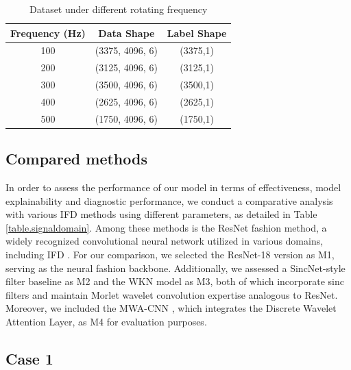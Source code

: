 \documentclass[lettersize,journal]{IEEEtran}
\begin{document}
\begin{table}[h]
    \centering
    \caption{Dataset under different rotating frequency}
    \begin{tabular*}{\linewidth}{@{\extracolsep{\fill}}ccc@{}} \hline
        
        \textbf{Frequency (Hz)} & \textbf{Data Shape} & \textbf{Label Shape} \\ \hline
        
        100 & (3375, 4096, 6) & (3375,1) \\
        
        200 & (3125, 4096, 6) & (3125,1) \\
        
        300 & (3500, 4096, 6) & (3500,1) \\
        
        400 & (2625, 4096, 6) & (2625,1) \\
        
        500 & (1750, 4096, 6) & (1750,1) \\ \hline
        
    \end{tabular*}
\label{WC}
\end{table}


\subsection{Compared methods}
In order to assess the performance of our model in terms of effectiveness, model explainability and diagnostic performance, we conduct a comparative analysis with various IFD methods using different parameters, as detailed in Table \ref{table.signaldomain}. Among these methods is the ResNet fashion method, a widely recognized convolutional neural network utilized in various domains, including IFD \cite{Wang2020}. For our comparison, we selected the ResNet-18 version as M1, serving as the neural fashion backbone. Additionally, we assessed a SincNet-style filter baseline \cite{ravanelli_interpretable_2019} as M2 and the WKN model \cite{Li2022} as M3, both of which incorporate sinc filters and maintain Morlet wavelet convolution expertise analogous to ResNet. Moreover, we included the MWA-CNN \cite{Wang2023}, which integrates the Discrete Wavelet Attention Layer, as M4 for evaluation purposes.


\subsection{Case 1}
\end{document}
